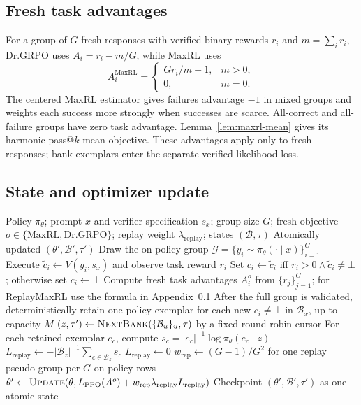 \documentclass{article}
\newcommand{\1}{\mathbf 1}
\theoremstyle{remark}
\theoremstyle{definition}
\theoremstyle{plain}
\begin{document}
\subsection{Fresh task advantages}
\label{app:binary-maxrl}

For a group of $G$ fresh responses with verified binary rewards $r_i$ and
$m=\sum_i r_i$, Dr.GRPO uses $A_i=r_i-m/G$, while MaxRL uses
\[
 A_i^{\mathrm{MaxRL}}=
 \begin{cases}
 G r_i/m-1, & m>0,\\
 0, & m=0.
 \end{cases}
\]
The centered MaxRL estimator \citep{tajwar2026maxrl} gives failures advantage
$-1$ in mixed groups and weights each success more strongly when successes
are scarce. All-correct and all-failure groups have zero task advantage.
Lemma~\ref{lem:maxrl-mean} gives its harmonic pass@\(k\) mean objective.
These advantages apply only to fresh responses; bank exemplars enter the
separate verified-likelihood loss.

\subsection{State and optimizer update}
\label{app:algorithm-update}

\begin{algorithm}[H]
  \caption{One ReplayMaxRL optimizer update}
  \label{alg:verified-replay-update}
  \small
  \begin{algorithmic}[1]
    \REQUIRE Policy $\pi_\theta$; prompt $x$ and verifier specification
      $s_x$; group size $G$; fresh objective $o\in\{\mathrm{MaxRL},\mathrm{Dr.GRPO}\}$; replay weight $\lambda_{\mathrm{replay}}$;
      states $(\mathcal B,\tau)$
    \ENSURE Atomically updated $(\theta',\mathcal B',\tau')$
    \STATE Draw the on-policy group
      $\mathcal G=\{y_i\sim\pi_\theta(\cdot\mid x)\}_{i=1}^G$
      \STATE Execute $\widetilde c_i\gets V(y_i,s_x)$ and observe task
        reward $r_i$
      \STATE Set $c_i\gets\widetilde c_i$ iff
        $r_i>0\wedge\widetilde c_i\ne\bot$; otherwise set $c_i\gets\bot$
    \ENDFOR
    \STATE Compute fresh task advantages $A_i^{o}$ from $\{r_j\}_{j=1}^G$; for ReplayMaxRL use the formula in Appendix~\ref{app:binary-maxrl}
    \STATE After the full group is validated, deterministically retain one
      policy exemplar for each new $c_i\ne\bot$ in $\mathcal B_x$, up to
      capacity $M$
    \STATE $(z,\tau')\gets\textsc{NextBank}
      (\{\mathcal B_u\}_u,\tau)$ by a fixed round-robin cursor
      \STATE For each retained exemplar $e_c$, compute
        $s_c=|e_c|^{-1}\log\pi_\theta(e_c\mid z)$
      \STATE $L_{\mathrm{replay}}\gets-|\mathcal B_z|^{-1}
        \sum_{c\in\mathcal B_z}s_c$
    \ELSE
      \STATE $L_{\mathrm{replay}}\gets0$
    \ENDIF
    \STATE $w_{\mathrm{rep}}\gets(G-1)/G^2$ for one replay
      pseudo-group per $G$ on-policy rows
    \STATE $\theta'\gets\textsc{Update}
      (\theta,L_{\mathrm{PPO}}(A^{o})
      +w_{\mathrm{rep}}\lambda_{\mathrm{replay}}L_{\mathrm{replay}})$
    \STATE Checkpoint $(\theta',\mathcal B',\tau')$ as one atomic state
\end{algorithmic}
\end{algorithm}
\end{document}
